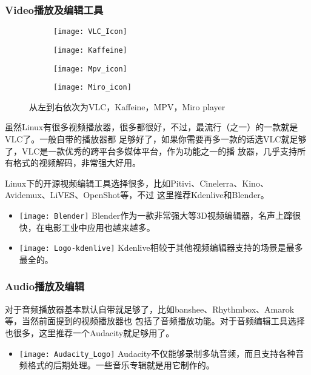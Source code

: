 \documentclass[11pt,fleqn]{book} %
\begin{document}
\subsubsection{Video播放及编辑工具}
\begin{figure}[!h]
  \begin{subfigure}{0.24\textwidth}
    \texttt{[image: VLC\_Icon]}
  \end{subfigure}
  \begin{subfigure}{0.24\textwidth}
    \texttt{[image: Kaffeine]}
  \end{subfigure}
  \begin{subfigure}{0.24\textwidth}
    \texttt{[image: Mpv\_icon]}
  \end{subfigure}
  \begin{subfigure}{0.24\textwidth}
    \texttt{[image: Miro\_icon]}
  \end{subfigure}
  \caption{从左到右依次为VLC，Kaffeine，MPV，Miro player}
\end{figure}
虽然Linux有很多视频播放器，很多都很好，不过，最流行（之一）的一款就是VLC了。一般自带的播放器都
足够好了，如果你需要再多一款的话选VLC就足够了，VLC是一款优秀的跨平台多媒体平台，作为功能之一的播
放器，几乎支持所有格式的视频解码，非常强大好用。

Linux下的开源视频编辑工具选择很多，比如Pitivi、Cinelerra、Kino、Avidemux、LiVES、OpenShot等，不过
这里推荐Kdenlive和Blender。
\begin{itemize}
  \item 
  \texttt{[image: Blender]}
Blender作为一款非常强大等3D视频编辑器，名声上蹿很快，在电影工业中应用也越来越多。
  \item 
  \texttt{[image: Logo-kdenlive]}
Kdenlive相较于其他视频编辑器支持的场景是最多最全的。
\end{itemize}

\subsubsection{Audio播放及编辑}
对于音频播放器基本默认自带就足够了，比如banshee、Rhythmbox、Amarok等，当然前面提到的视频播放器也
包括了音频播放功能。对于音频编辑工具选择也很多，这里推荐一个Audacity就足够用了。
\begin{itemize}
  \item \texttt{[image: Audacity\_Logo]}
    Audacity不仅能够录制多轨音频，而且支持各种音频格式的后期处理。一些音乐专辑就是用它制作的。
\end{itemize}
\end{document}
